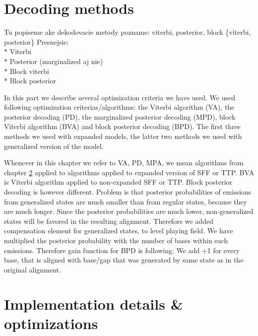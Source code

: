 \section{Decoding methods}
\begin{reformulate*}
Tu popiseme ake dekodovacie metody pozname: viterbi, posterior, block \{viterbi,
posterior\}
Presnejsie:\\
$*$ Viterbi\\
$*$ Posterior (marginalized aj nie)\\
$*$ Block viterbi\\
$*$ Block posterior\\
\end{reformulate*}

In this part we describe several optimization criteria we have used. We used
following optimization criterias/algorithms: the Viterbi algorithm (VA), the
posterior decoding (PD), the marginalized posterior decoding (MPD), block
Viterbi algorithm (BVA) and block posterior decoding (BPD). The first three
methods we used with expanded models, the latter two methods we used with
generalized version of the model.


Whenever in this chapter we refer to VA, PD, MPA, we mean algorithms from
chapter \ref{} applied to algorithms applied to expanded version of SFF or TTP.
BVA is Viterbi algorithm applied to non-expanded SFF or TTP. Block posterior
decoding is however different. Problem is that posterior probabilities of
emissions from generalized states are much smaller than from regular states,
because they are much longer. Since the posterior probabilities are much lower,
non-generalized states will be favored in the resulting alignment. Therefore 
we added compensation element for generalized states, to level playing field.
We have multiplied the posterior probability with the number of bases within
such emissions. Therefore gain function for BPD is following: We add +1 for
every base, that is aligned with base/gap that was generated by same state as
in the original alignment.


\section{Implementation details \& optimizations}

